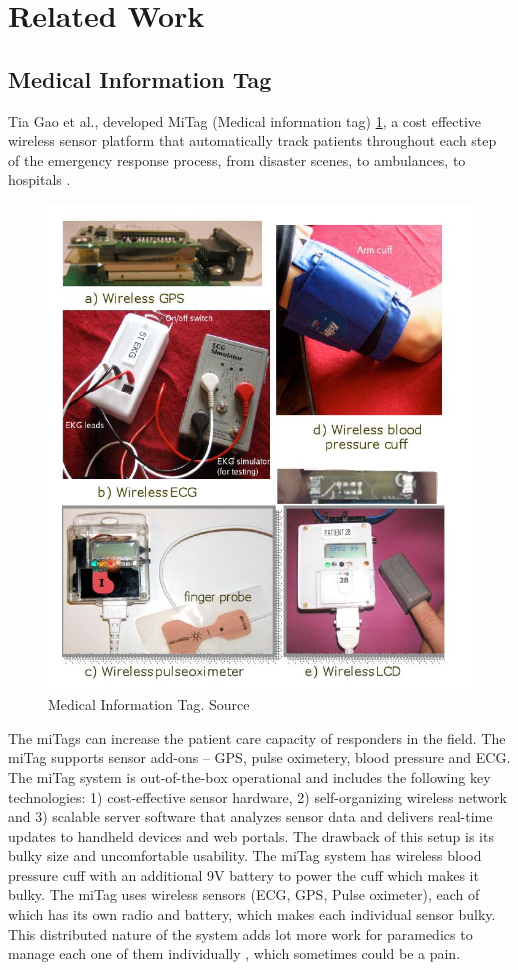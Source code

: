 \section{Related Work}

\subsection{Medical Information Tag}
\hspace{10mm}  Tia Gao et al., developed MiTag (Medical information tag) \ref{fig:miTag}, a cost effective 
wireless sensor platform that automatically track patients 
throughout each step of the emergency response process, from disaster 
scenes, to ambulances, to hospitals \cite{miTag}.
\begin{figure}[h]
	\centering
	\includegraphics[scale = 0.6 ]{miTag.JPG}
	\caption{Medical Information Tag. Source \cite{miTag}\label{fig:miTag}}
\end{figure}
The miTags can increase 
the patient care capacity of responders in the field. The miTag  supports sensor add-ons – GPS, pulse oximetery, blood pressure and ECG. 
The miTag system is out-of-the-box operational and includes the following key technologies: 1) cost-effective sensor hardware, 2) 
self-organizing wireless network and 3) scalable server software 
that analyzes sensor data and delivers real-time updates to 
handheld devices and web portals. The drawback of this setup is its bulky size and uncomfortable usability. The miTag system has wireless blood pressure cuff with an additional 9V battery to power the cuff which makes it bulky. The miTag uses wireless sensors (ECG, GPS, Pulse oximeter), each of which has its own radio and battery, which makes each individual sensor bulky. This distributed nature of the system adds lot more work for paramedics to manage each one of them individually , which sometimes could be a pain. 
